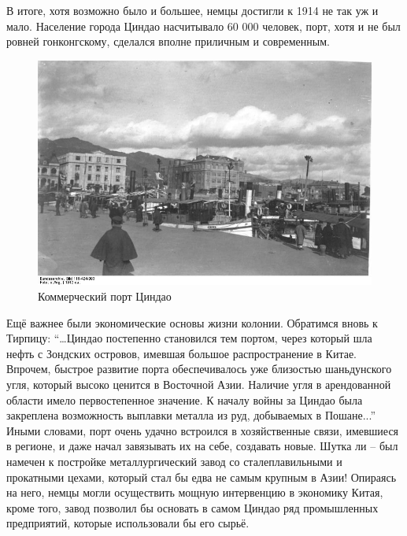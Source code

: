 В итоге, хотя возможно было и большее, немцы достигли к 1914 не так уж и мало. Население города Циндао насчитывало 60 000 человек, порт, хотя и не был ровней гонконгскому, сделался вполне приличным и современным. 

\begin{figure}[h!tb] 
	\centering\includegraphics[scale=0.4]{Glava3/Pbn9u-W-zLI.jpg}
	\caption{Коммерческий порт Циндао}%
\end{figure}

Ещё важнее были экономические основы жизни колонии. Обратимся вновь к Тирпицу: “…Циндао постепенно становился тем портом, через который шла нефть с Зондских островов, имевшая большое распространение в Китае. Впрочем, быстрое развитие порта обеспечивалось уже близостью шаньдунского угля, который высоко ценится в Восточной Азии. Наличие угля в арендованной области имело первостепенное значение. К началу войны за Циндао была закреплена возможность выплавки металла из руд, добываемых в Пошане...” Иными словами, порт очень удачно встроился в хозяйственные связи, имевшиеся в регионе, и даже начал завязывать их на себе, создавать новые. Шутка ли – был намечен к постройке металлургический завод со сталеплавильными и прокатными цехами, который стал бы едва не самым крупным в Азии! Опираясь на него, немцы могли осуществить мощную интервенцию в экономику Китая, кроме того, завод позволил бы основать в самом Циндао ряд промышленных предприятий, которые использовали бы его сырьё.

